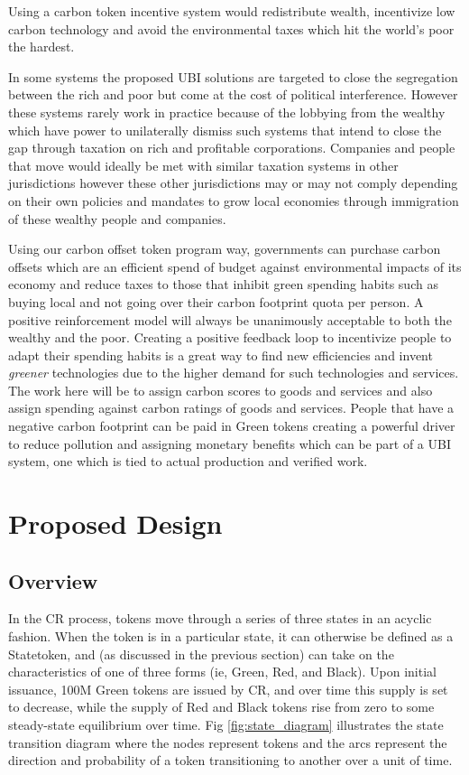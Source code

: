 \documentclass{article}
\begin{document}
Using a carbon token incentive system would redistribute wealth, incentivize low carbon
technology and avoid the environmental taxes which hit the world’s poor the hardest.

In some systems the proposed UBI solutions are targeted to close the segregation between
the rich and poor but come at the cost of political interference. However these systems
rarely work in practice because of the lobbying from the wealthy which have power to
unilaterally dismiss such systems that intend to close the gap through taxation on rich and
profitable corporations. Companies and people that move would ideally be met with similar
taxation systems in other jurisdictions however these other jurisdictions may or may not
comply depending on their own policies and mandates to grow local economies through
immigration of these wealthy people and companies.

Using our carbon offset token program way, governments can purchase carbon offsets
which are an efficient spend of budget against environmental impacts of its economy and
reduce taxes to those that inhibit green spending habits such as buying local and not going
over their carbon footprint quota per person. A positive reinforcement model will always be
unanimously acceptable to both the wealthy and the poor. Creating a positive feedback loop
to incentivize people to adapt their spending habits is a great way to find new efficiencies
and invent \emph{greener} technologies due to the higher demand for such technologies and
services. The work here will be to assign carbon scores to goods and services and also
assign spending against carbon ratings of goods and services. People that have a negative
carbon footprint can be paid in Green tokens creating a powerful driver to reduce pollution
and assigning monetary benefits which can be part of a UBI system, one which is tied to
actual production and verified work.

\section{Proposed Design}

\subsection{Overview}

In the CR process, tokens move through a series of three states in an acyclic fashion. When the token is in a particular state, it can otherwise be defined as a Statetoken, and (as discussed in the previous section) can take on the characteristics of one of three forms (ie, Green, Red, and Black). Upon initial issuance, 100M Green tokens are issued by CR, and over time this supply is set to decrease, while the supply of Red and Black tokens rise from zero to some steady-state equilibrium over time. Fig \ref{fig:state_diagram} illustrates the state transition diagram where the nodes represent tokens and the arcs represent the direction and probability of a token transitioning to another over a unit of time.
\end{document}
